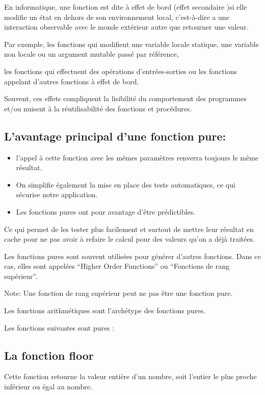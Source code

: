\documentclass[12pt,titlepage]{article}
\begin{document}
En informatique, une fonction est dite à effet de bord (effet secondaire )si elle modifie un état en dehors de son environnement local, c'est-à-dire a une interaction observable avec le monde extérieur autre que retourner une valeur.

Par exemple, les fonctions qui modifient une variable locale statique, une variable non locale ou un argument mutable passé par référence,

les fonctions qui effectuent des opérations d'entrées-sorties ou les fonctions appelant d'autres fonctions à effet de bord.

Souvent, ces effets compliquent la lisibilité du comportement des programmes et/ou nuisent à la réutilisabilité des fonctions et procédures.

\subsection{L’avantage principal d'une fonction pure:}

\begin{itemize}
	\item l'appel à cette fonction avec les mêmes paramètres renverra toujours le même résultat.
	\item On simplifie également la mise en place des tests automatiques, ce qui sécurise notre application.
	\item Les fonctions pures ont pour avantage d’être prédictibles.
\end{itemize}

Ce qui permet de les tester plus facilement et surtout de mettre leur résultat en cache pour ne pas avoir à refaire le calcul pour des valeurs qu’on a déjà traitées.

Les fonctions pures sont souvent utilisées pour générer d’autres fonctions. Dans ce cas, elles sont appelées “Higher Order Functions” ou “Fonctions de rang supérieur”.

Note: Une fonction de rang supérieur peut ne pas être une fonction pure.


Les fonctions arithmétiques sont l'archétype des fonctions pures.

Les fonctions  suivantes sont pures :


\subsection{La fonction floor}

Cette fonction retourne la valeur entière d'un nombre, soit l'entier le plus proche inférieur ou égal au nombre.
\end{document}
